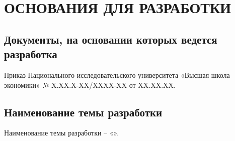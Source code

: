 \section{ОСНОВАНИЯ ДЛЯ РАЗРАБОТКИ}

\subsection{Документы, на основании которых ведется разработка}
Приказ Национального исследовательского университета «Высшая школа экономики» № X.XX.X-XX/XXXX-XX от XX.XX.XX.

\subsection{Наименование темы разработки}
    Наименование темы разработки – «\docTitle».

\clearpage